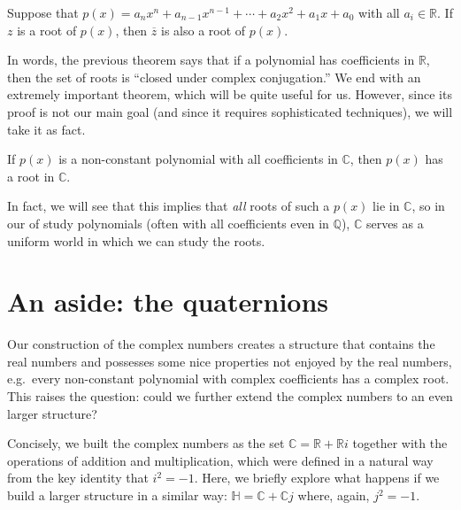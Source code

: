 \begin{theorem}\label{thm.RootsRealCoeff}
Suppose that $p(x) = a_nx^n + a_{n-1}x^{n-1} +\cdots+a_2x^2+a_1x+a_0$ with all $a_i\in \mathbb{R}$. If $z$ is a root of $p(x)$, then $\overline{z}$ is also a root of $p(x)$.
\end{theorem}

In words, the previous theorem says that if a polynomial has coefficients in $\mathbb{R}$, then the set of roots is ``closed under complex conjugation.'' We end with an extremely important theorem, which will be quite useful for us. However, since its proof is not our main goal (and since it requires sophisticated techniques), we will take it as fact.

\begin{fact}\label{fact.FTA}
If $p(x)$ is a non-constant polynomial with all coefficients in $\mathbb{C}$, then $p(x)$ has a root in $\mathbb{C}$.
\end{fact}

In fact, we will see that this implies that \emph{all} roots of such a $p(x)$ lie in $\mathbb{C}$, so in our of study polynomials (often with all coefficients even in $\mathbb{Q}$), $\mathbb{C}$ serves as a uniform world in which we can study the roots.

\section{An aside: the quaternions}
Our construction of the complex numbers creates a structure that contains the real numbers and possesses some nice properties not enjoyed by the real numbers, e.g.~every non-constant polynomial with complex coefficients has a complex root.  This raises the question: could we further extend the complex numbers to an even larger structure?

Concisely, we built the complex numbers as the set $\mathbb{C} = \mathbb{R} + \mathbb{R}i$ together with the operations of addition and multiplication, which were defined in a natural way from the key identity that $i^2 = -1$. Here, we briefly explore what happens if we build a larger structure in a similar way: $\mathbb{H} = \mathbb{C} + \mathbb{C}j$ where, again, $j^2 = -1$. 

